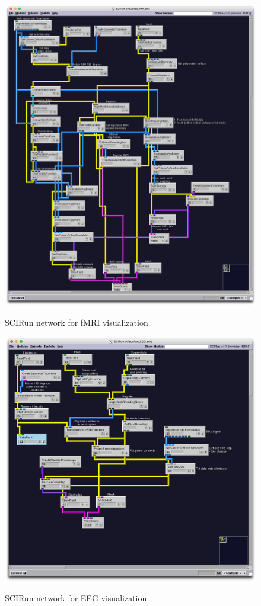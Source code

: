 \begin{figure}[p]
\begin{center}
\includegraphics[width=\textwidth]{Figures/fmri_network.png}\\
\caption{SCIRun network for fMRI visualization}
\label{fig:fmrivisnet}
\end{center}
\end{figure}

\begin{figure}[p]
\begin{center}
\includegraphics[width=\textwidth]{Figures/EEG_network.png}\\
\caption{SCIRun network for EEG visualization}
\label{fig:eegvisnet}
\end{center}
\end{figure} 